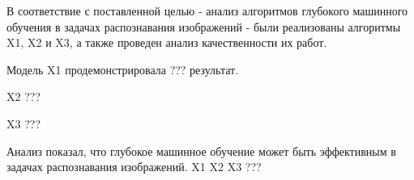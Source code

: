 В соответствие с поставленной целью - анализ алгоритмов глубокого машинного обучения в задачах распознавания изображений - были реализованы алгоритмы X1, X2 и X3, а также проведен анализ качественности их работ.

Модель X1 продемонстрировала ??? результат.

X2 ???

X3 ???

Анализ показал, что глубокое машинное обучение может быть эффективным в задачах распознавания изображений. X1 X2 X3 ???
\clearpage